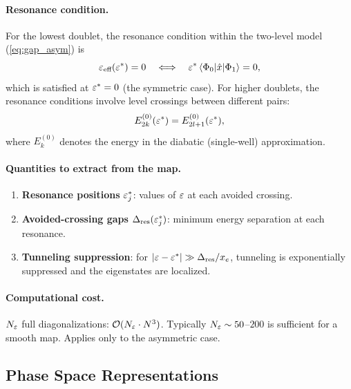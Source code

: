 \paragraph{Resonance condition.}

For the lowest doublet, the resonance condition within the two-level model (\cref{eq:gap_asym}) is
\begin{equation}
  \varepsilon_{\text{eff}}(\varepsilon^*) = 0
  \quad\Longleftrightarrow\quad
  \varepsilon^*\mel{\Phi_0}{\hat{x}}{\Phi_1} = 0,
\end{equation}
which is satisfied at $\varepsilon^* = 0$ (the symmetric case).
For higher doublets, the resonance conditions involve level crossings between different pairs:
\begin{equation}
  E_{2k}^{(0)}(\varepsilon^*) = E_{2l+1}^{(0)}(\varepsilon^*),
\end{equation}
where $E_k^{(0)}$ denotes the energy in the diabatic (single-well) approximation.

\paragraph{Quantities to extract from the map.}

\begin{enumerate}[label=(\roman*)]
  \item \textbf{Resonance positions} $\varepsilon_j^*$: values of $\varepsilon$ at each avoided crossing.
  \item \textbf{Avoided-crossing gaps} $\Delta_{\text{res}}(\varepsilon_j^*)$: minimum energy separation at each resonance.
  \item \textbf{Tunneling suppression}: for $|\varepsilon - \varepsilon^*| \gg \Delta_{\text{res}}/x_e$, tunneling is exponentially suppressed and the eigenstates are localized.
\end{enumerate}

\paragraph{Computational cost.}
$N_\varepsilon$ full diagonalizations: $\mathcal{O}(N_\varepsilon \cdot N^3)$.
Typically $N_\varepsilon \sim 50$--$200$ is sufficient for a smooth map.
Applies only to the asymmetric case.

\subsection{Phase Space Representations}\label{sec:phase_space_rep}

